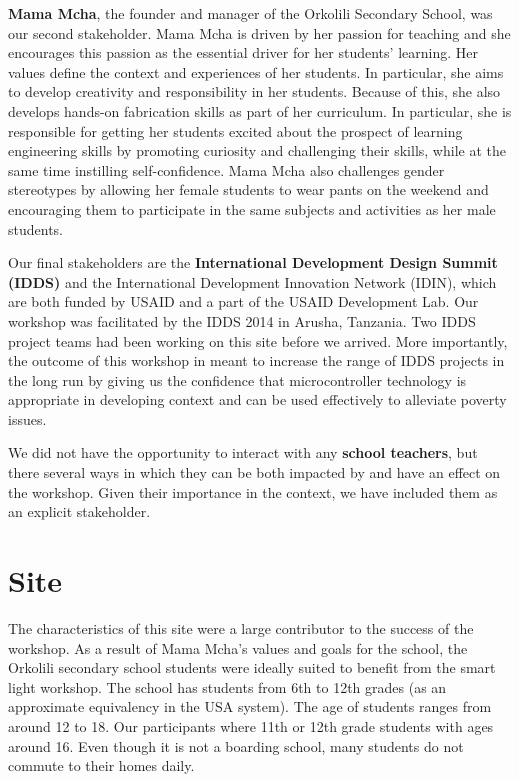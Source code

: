 \documentclass[11pt, twocolumn]{article}
\begin{document}
\textbf{Mama Mcha}, the founder and manager of the Orkolili Secondary School, was our second stakeholder. Mama Mcha is driven by her passion for teaching and she encourages this passion as the essential driver for her students’ learning. Her values define the context and experiences of her students. In particular, she aims to develop creativity and responsibility in her students. Because of this, she also develops hands-on fabrication skills as part of her curriculum. In particular, she is responsible for getting her students excited about the prospect of learning engineering skills by promoting curiosity and challenging their skills, while at the same time instilling self-confidence. Mama Mcha also challenges gender stereotypes by allowing her female students to wear pants on the weekend and encouraging them to participate in the same subjects and activities as her male students.

Our final stakeholders are the \textbf{International Development Design Summit (IDDS)} and the International Development Innovation Network (IDIN), which are both funded by USAID and a part of the USAID Development Lab. Our workshop was facilitated by the IDDS 2014 in Arusha, Tanzania. Two IDDS project teams had been working on this site before we arrived. More importantly, the outcome of this workshop in meant to increase the range of IDDS projects in the long run by giving us the confidence that microcontroller technology is appropriate in developing context and can be used effectively to alleviate poverty issues.

We did not have the opportunity to interact with any \textbf{school teachers}, but there several ways in which they can be both impacted by and have an effect on the workshop. Given their importance in the context, we have included them as an explicit stakeholder.

\section*{Site}
The characteristics of this site were a large contributor to the success of the workshop. As a result of Mama Mcha’s values and goals for the school, the Orkolili secondary school students were ideally suited to benefit from the smart light workshop. The school has students from 6th to 12th grades (as an approximate equivalency in the USA system). The age of students ranges from around 12 to 18. Our participants where 11th or 12th grade students with ages around 16. Even though it is not a boarding school, many students do not commute to their homes daily.
\end{document}
